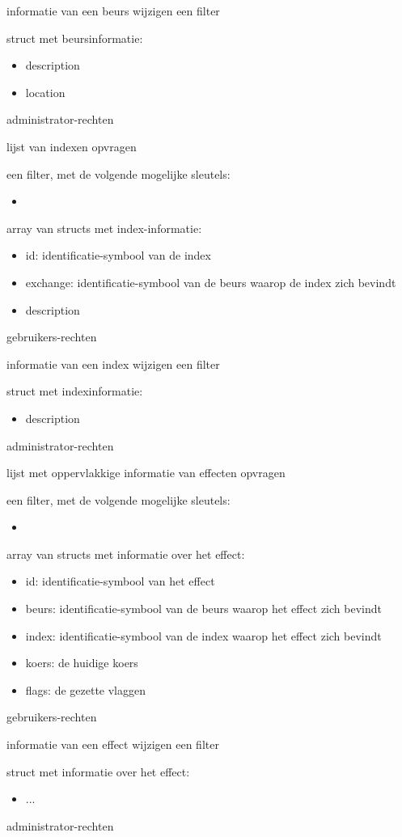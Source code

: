 	{ informatie van een beurs wijzigen }
	{ een filter }
	{ struct met beursinformatie:
		\begin{itemize}
		\item{description}
		\item{location}
		\end{itemize} }
	{ administrator-rechten }

	{ lijst van indexen opvragen }
	{ een filter, met de volgende mogelijke sleutels:
		\begin{itemize}
		\item{}
		\end{itemize} }
	{ array van structs met index-informatie:
		\begin{itemize}
		\item{id: identificatie-symbool van de index}
		\item{exchange: identificatie-symbool van de beurs waarop de index zich bevindt}
		\item{description}
		\end{itemize} }
	{ gebruikers-rechten }

	{ informatie van een index wijzigen }
	{ een filter }
	{ struct met indexinformatie:
		\begin{itemize}
		\item{description}
		\end{itemize} }
	{ administrator-rechten }

	{ lijst met oppervlakkige informatie van effecten opvragen }
	{ een filter, met de volgende mogelijke sleutels:
		\begin{itemize}
		\item{}
		\end{itemize} }
	{ array van structs met informatie over het effect:
		\begin{itemize}
		\item{id: identificatie-symbool van het effect}
		\item{beurs: identificatie-symbool van de beurs waarop het effect zich bevindt}
		\item{index: identificatie-symbool van de index waarop het effect zich bevindt}
		\item{koers: de huidige koers}
		\item{flags: de gezette vlaggen}
		\end{itemize} }
	{ gebruikers-rechten }

	{ informatie van een effect wijzigen }
	{ een filter }
	{ struct met informatie over het effect:
		\begin{itemize}
		\item{...}
		\end{itemize} }
	{ administrator-rechten }

